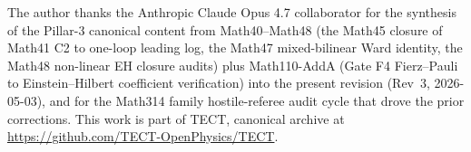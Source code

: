 \begin{acknowledgments}
The author thanks the Anthropic Claude Opus 4.7 collaborator for
the synthesis of the Pillar-3 canonical content from
Math40--Math48 (the Math45 closure of Math41 C2 to one-loop
leading log, the Math47 mixed-bilinear Ward identity, the Math48
non-linear EH closure audits) plus Math110-AddA (Gate F4
Fierz--Pauli to Einstein--Hilbert coefficient verification) into
the present revision (Rev~3, 2026-05-03), and for the Math314
family hostile-referee audit cycle that drove the prior corrections.
This work is part of TECT, canonical archive at
\url{https://github.com/TECT-OpenPhysics/TECT}.
\end{acknowledgments}





